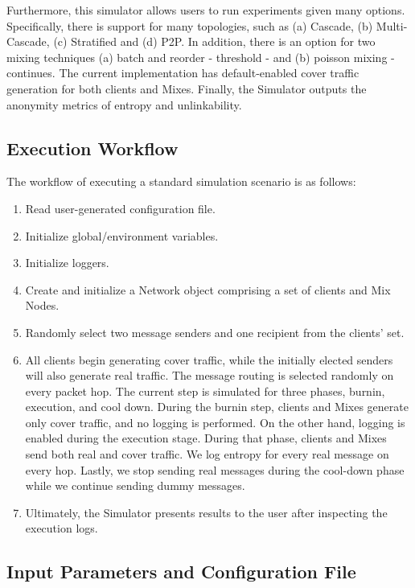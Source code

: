\documentclass[logo,msc,cyber]{infthesis}   %
\begin{document}
Furthermore, this simulator allows users to run experiments given many options.
Specifically, there is support for many topologies, such as (a) Cascade, (b)
Multi-Cascade, (c) Stratified and (d) P2P. In addition, there is an option for two
mixing techniques (a) batch and reorder - threshold - and (b) poisson mixing
-continues. The current implementation has default-enabled cover traffic
generation for both clients and Mixes. Finally, the Simulator outputs the
anonymity metrics of entropy and unlinkability.

\subsection{Execution Workflow}

The workflow of executing a standard simulation scenario is as follows:

\begin{enumerate}
    \item Read user-generated configuration file.
    \item Initialize global/environment variables.
    \item Initialize loggers.
    \item Create and initialize a Network object comprising a set of clients and Mix Nodes.
    \item Randomly select two message senders and one recipient from the clients' set.
    \item All clients begin generating cover traffic, while the initially
    elected senders will also generate real traffic. The message routing is
    selected randomly on every packet hop. The current step is simulated for
    three phases, burnin, execution, and cool down. During the burnin step,
    clients and Mixes generate only cover traffic, and no logging is performed.
    On the other hand, logging is enabled during the execution stage. During
    that phase, clients and Mixes send both real and cover traffic. We log
    entropy for every real message on every hop. Lastly, we stop sending real
    messages during the cool-down phase while we continue sending dummy
    messages.
    \item Ultimately, the Simulator presents results to the user after
    inspecting the execution logs.
\end{enumerate}

\subsection{Input Parameters and Configuration File}
\end{document}
